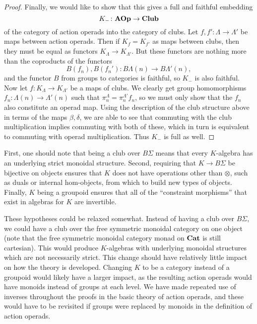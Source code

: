 \begin{proof}
Finally, we would like to show that this gives a full and faithful embedding
    \[
        K_{-} \colon \mathbf{AOp} \rightarrow \mathbf{Club}
    \]
of the category of action operads into the category of clubs. Let $f, f' \colon \Lambda \rightarrow \Lambda'$ be maps between action operads. Then if $K_{f} = K_{f'}$ as maps between clubs, then they must be equal as functors $K_{\Lambda} \rightarrow K_{\Lambda'}$. But these functors are nothing more than the coproducts of the functors
  \[
    B(f_{n}), B(f_{n}') \colon B\Lambda(n) \rightarrow B\Lambda'(n),
  \]
and the functor $B$ from groups to categories is faithful, so $K_{-}$ is also faithful. Now let $f \colon K_{\Lambda} \rightarrow K_{\Lambda'}$ be a maps of clubs. We clearly get group homomorphisms $f_{n} \colon \Lambda(n) \rightarrow \Lambda'(n)$ such that $\pi^{\Lambda}_{n} = \pi^{\Lambda'}_{n} f_{n}$, so we must only show that the $f_{n}$ also constitute an operad map. Using the description of the club structure above in terms of the maps $\beta, \delta$, we are able to see that commuting with the club multiplication implies commuting with both of these, which in turn is equivalent to commuting with operad multiplication. Thus $K_{-}$ is full as well.
\end{proof}

\begin{rem}
First, one should note that being a club over $B\Sigma$ means that every $K$-algebra has an underlying strict monoidal structure. Second, requiring that $K \rightarrow B\Sigma$ be bijective on objects ensures that $K$ does not have  operations other than $\otimes$, such as duals or internal hom-objects, from which to build new types of objects. Finally, $K$ being a groupoid ensures that all of the ``constraint morphisms'' that exist in algebras for $K$ are invertible.

These hypotheses could be relaxed somewhat. Instead of having a club over $B\Sigma$, we could have a club over the free symmetric monoidal category on one object (note that the free symmetric monoidal category monad on $\mathbf{Cat}$ is still cartesian). This would produce $K$-algebras with underlying monoidal structures which are not necessarily strict. This change should have relatively little impact on how the theory is developed. Changing $K$ to be a category instead of a groupoid would likely have a larger impact, as the resulting action operads would have monoids instead of groups at each level. We have made repeated use of inverses throughout the proofs in the basic theory of action operads, and these would have to be revisited if groups were replaced by monoids in the definition of action operads.
\end{rem}

